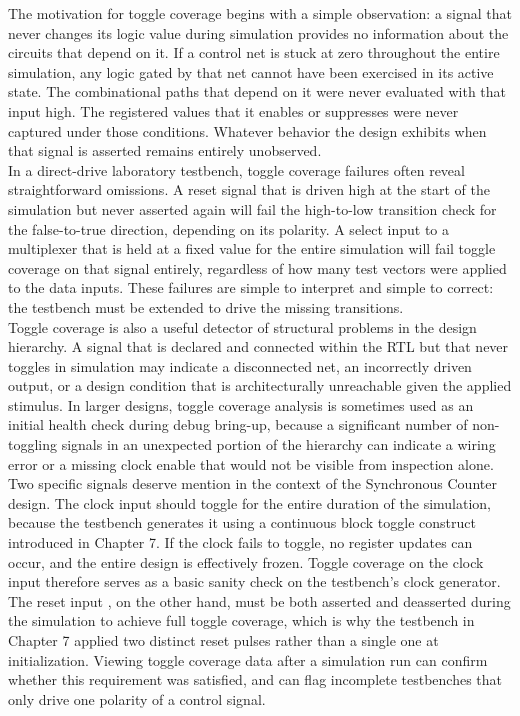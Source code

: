 The motivation for toggle coverage begins with a simple observation: a signal that never changes its logic value during simulation provides no information about the circuits that depend on it. If a control net is stuck at zero throughout the entire simulation, any logic gated by that net cannot have been exercised in its active state. The combinational paths that depend on it were never evaluated with that input high. The registered values that it enables or suppresses were never captured under those conditions. Whatever behavior the design exhibits when that signal is asserted remains entirely unobserved.\\

In a direct-drive laboratory testbench, toggle coverage failures often reveal straightforward omissions. A reset signal that is driven high at the start of the simulation but never asserted again will fail the high-to-low transition check for the false-to-true direction, depending on its polarity. A select input to a multiplexer that is held at a fixed value for the entire simulation will fail toggle coverage on that signal entirely, regardless of how many test vectors were applied to the data inputs. These failures are simple to interpret and simple to correct: the testbench must be extended to drive the missing transitions.\\

Toggle coverage is also a useful detector of structural problems in the design hierarchy. A signal that is declared and connected within the RTL but that never toggles in simulation may indicate a disconnected net, an incorrectly driven output, or a design condition that is architecturally unreachable given the applied stimulus. In larger designs, toggle coverage analysis is sometimes used as an initial health check during debug bring-up, because a significant number of non-toggling signals in an unexpected portion of the hierarchy can indicate a wiring error or a missing clock enable that would not be visible from inspection alone.\\

Two specific signals deserve mention in the context of the Synchronous Counter design. The clock input  should toggle for the entire duration of the simulation, because the testbench generates it using a continuous  block toggle construct introduced in Chapter 7. If the clock fails to toggle, no register updates can occur, and the entire design is effectively frozen. Toggle coverage on the clock input therefore serves as a basic sanity check on the testbench's clock generator. The reset input , on the other hand, must be both asserted and deasserted during the simulation to achieve full toggle coverage, which is why the testbench in Chapter 7 applied two distinct reset pulses rather than a single one at initialization. Viewing toggle coverage data after a simulation run can confirm whether this requirement was satisfied, and can flag incomplete testbenches that only drive one polarity of a control signal.\\

